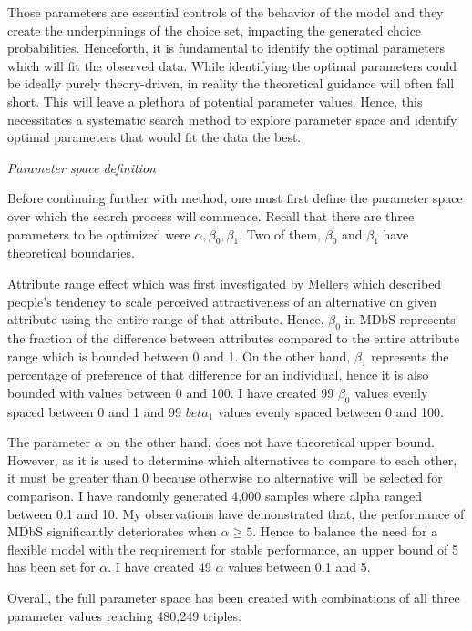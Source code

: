\documentclass[a4paper,12pt]{article}
\newcommand{\citeyearonly}[1]{\citeyearpar{#1}}
\begin{document}
Those parameters are essential controls of the behavior of the model and they create the underpinnings of the choice set, impacting the generated choice probabilities. Henceforth, it is fundamental to identify the optimal parameters which will fit the observed data. While identifying the optimal parameters could be ideally purely theory-driven, in reality the theoretical guidance will often fall short. This will leave a plethora of potential parameter values. Hence, this necessitates a systematic search method to explore parameter space and identify optimal parameters that would fit the data the best.

\textit{Parameter space definition}

Before continuing further with method, one must first define the parameter space over which the search process will commence. Recall that there are three parameters to be optimized were $\alpha, \beta_0, \beta_1$. Two of them, $\beta_0$ and $\beta_1$ have theoretical boundaries. 

Attribute range effect which was first investigated by Mellers \citeyearonly{mellers1994trade} which described people's tendency to scale perceived attractiveness of an alternative on given attribute using the entire range of that attribute. Hence, $\beta_0$ in MDbS represents the fraction of the difference between attributes compared to the entire attribute range which is bounded between 0 and 1. On the other hand, $\beta_1$ represents the percentage of preference of that difference for an individual, hence it is also bounded with values between 0 and 100. I have created 99 $\beta_0$ values evenly spaced between 0 and 1 and 99 $beta_1$ values evenly spaced between 0 and 100.

The parameter $\alpha$ on the other hand, does not have theoretical upper bound. However, as it is used to determine which alternatives to compare to each other, it must be greater than 0 because otherwise no alternative will be selected for comparison. I have randomly generated 4,000 samples where alpha ranged between 0.1 and 10. My observations have demonstrated that, the performance of MDbS significantly deteriorates when $\alpha \ge 5$. Hence to balance the need for a flexible model with the requirement for stable performance, an upper bound of 5 has been set for $\alpha$. I have created 49 $\alpha$ values between 0.1 and 5.

Overall, the full parameter space has been created with combinations of all three parameter values reaching 480,249 triples.
\end{document}
